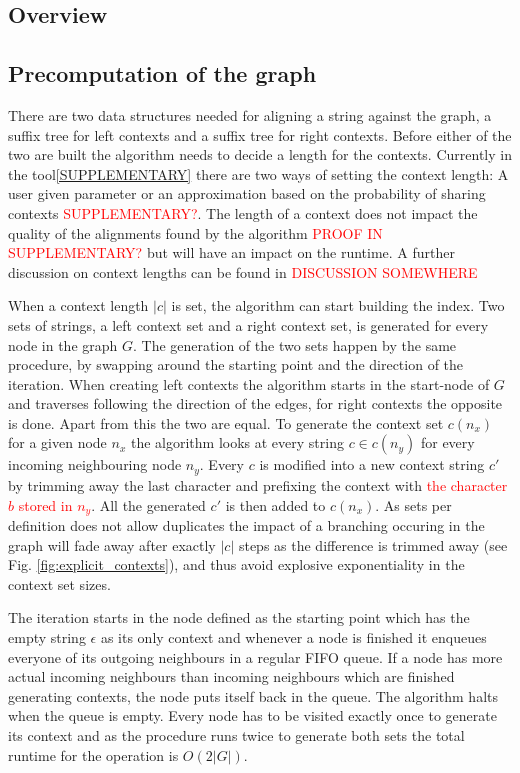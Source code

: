 \documentclass{article}
\begin{document}
\subsection{Overview}
\subsection{Precomputation of the graph}
There are two data structures needed for aligning a string against the graph, a suffix tree for left contexts and a suffix tree for right contexts. Before either of the two are built the algorithm needs to decide a length for the contexts. Currently in the tool\ref{SUPPLEMENTARY} there are two ways of setting the context length: A user given parameter or an approximation based on the probability of sharing contexts \textcolor{red}{SUPPLEMENTARY?}. The length of a context does not impact the quality of the alignments found by the algorithm \textcolor{red}{PROOF IN SUPPLEMENTARY?} but will have an impact on the runtime. A further discussion on context lengths can be found in \textcolor{red}{DISCUSSION SOMEWHERE}\\
\par\noindent
When a context length $|c|$ is set, the algorithm can start building the index. Two sets of strings, a left context set and a right context set, is generated for every node in the graph $G$. The generation of the two sets happen by the same procedure, by swapping around the starting point and the direction of the iteration. When creating left contexts the algorithm starts in the start-node of $G$ and traverses following the direction of the edges, for right contexts the opposite is done. Apart from this the two are equal. To generate the context set $c(n_x)$ for a given node $n_x$ the algorithm looks at every string $c \in c(n_y)$ for every incoming neighbouring node $n_y$. Every $c$ is modified into a new context string $c'$ by trimming away the last character and prefixing the context with \textcolor{red}{the character $b$ stored in $n_y$}. All the generated $c'$ is then added to $c(n_x)$. As sets per definition does not allow duplicates the impact of a branching occuring in the graph will fade away after exactly $|c|$ steps as the difference is trimmed away (see Fig. \ref{fig:explicit_contexts}), and thus avoid explosive exponentiality in the context set sizes.\\
\par\noindent
The iteration starts in the node defined as the starting point which has the empty string $\epsilon$ as its only context and whenever a node is finished it enqueues everyone of its outgoing neighbours in a regular FIFO queue. If a node has more actual incoming neighbours than incoming neighbours which are finished generating contexts, the node puts itself back in the queue. The algorithm halts when the queue is empty. Every node has to be visited exactly once to generate its context and as the procedure runs twice to generate both sets the total runtime for the operation is $O(2|G|)$.\\
\end{document}
